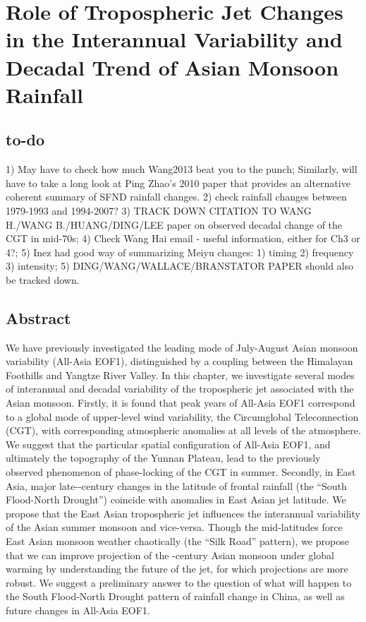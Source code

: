 \chapter{Role of Tropospheric Jet Changes in the Interannual Variability and Decadal Trend of Asian Monsoon Rainfall}

\section{to-do}
1) May have to check how much Wang2013 beat you to the punch; Similarly, will have to take a long look at Ping Zhao's 2010 paper that provides an alternative coherent summary of SFND rainfall changes. 2) check rainfall changes between 1979-1993 and 1994-2007? 3) TRACK DOWN CITATION TO WANG H./WANG B./HUANG/DING/LEE paper on observed decadal change of the CGT in mid-70s; 4) Check Wang Hai email - useful information, either for Ch3 or 4?; 5) Inez had good way of summarizing Meiyu changes: 1) timing 2) frequency 3) intensity; 5) DING/WANG/WALLACE/BRANSTATOR PAPER should also be tracked down.

\section{Abstract}
We have previously investigated the leading mode of July-August Asian monsoon variability (All-Asia EOF1), distinguished by a coupling between the Himalayan Foothills and Yangtze River Valley. In this chapter, we investigate several modes of interannual and decadal variability of the tropospheric jet associated with the Asian monsoon. Firstly, it is found that peak years of All-Asia EOF1 correspond to a global mode of upper-level wind variability, the Circumglobal Teleconnection (CGT), with corresponding atmospheric anomalies at all levels of the atmosphere. We suggest that the particular spatial configuration of All-Asia EOF1, and ultimately the topography of the Yunnan Plateau, lead to the previously observed phenomenon of phase-locking of the CGT in summer. Secondly, in East Asia, major late--century changes in the latitude of frontal rainfall (the ``South Flood-North Drought'') coincide with anomalies in East Asian jet latitude.  We propose that the East Asian tropospheric jet influences the interannual variability of the Asian summer monsoon and vice-versa. Though the mid-latitudes force East Asian monsoon weather chaotically (the ``Silk Road'' pattern), we propose that we can improve projection of the -century Asian monsoon under global warming by understanding the future of the jet, for which projections are more robust. We suggest a preliminary answer to the question of what will happen to the South Flood-North Drought pattern of rainfall change in China, as well as future changes in All-Asia EOF1.

